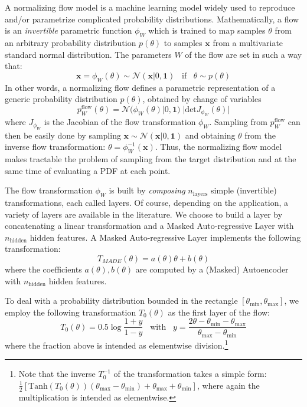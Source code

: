 \documentclass[twocolumn,showpacs,preprintnumbers,nofootinbib,prd,
superscriptaddress,10pt]{revtex4-2}
\begin{document}
A normalizing flow model \cite{norm_flow, nflows_paper, Kobyzev_2021, Papamakarios_thesis} is a machine learning model widely used to reproduce and/or parametrize complicated probability distributions.
Mathematically, a flow is an {\it invertible} parametric function $\phi_W$ which is trained to map samples $\theta$ from an arbitrary probability distribution $p(\theta)$ to samples $\mathbf{x}$ from a multivariate standard normal distribution.
The parameters $W$ of the flow are set in such a way that:
\begin{equation}
	\mathbf{x} = \phi_W(\theta) \sim \mathcal{N}(\mathbf{x}|0,\mathbf{1}) \;\;\; \text{if} \;\;\;  \theta \sim p(\theta)
\end{equation}
%
In other words, a normalizing flow defines a parametric representation of a generic probability distribution $p(\theta)$, obtained by change of variables
\begin{equation}\label{eq:p_flow}
	p^\text{flow}_W(\theta) = \mathcal{N}(\phi_W(\theta)|0,\mathbf{1}) \; |\text{det} J_{\phi_W}(\theta)|
\end{equation}
where $J_{\phi_W}$ is the Jacobian of the flow transformation $\phi_W$.
Sampling from $p^\text{flow}_W$ can then be easily done by sampling $\mathbf{x} \sim \mathcal{N}(\mathbf{x}|0,\mathbf{1})$ and obtaining $\theta$ from the inverse flow transformation: $\theta = \phi_W^{-1}(\mathbf{x})$.
Thus, the normalizing flow model makes tractable the problem of sampling from the target distribution and at the same time of evaluating a PDF at each point.


The flow transformation $\phi_W$ is built by {\it composing} $n_\text{layers}$ simple (invertible) transformations, each called layers. Of course, depending on the application, a variety of layers are available in the literature. We choose to build a layer by concatenating a linear transformation and a Masked Auto-regressive Layer \cite{MADE, MAF,MAF_bis} with $n_\text{hidden}$ hidden features.
A Masked Auto-regressive Layer implements the following transformation:
\begin{equation}
	T_{MADE}(\theta) = a(\theta)\theta+b(\theta)
\end{equation}
where the coefficients $a(\theta), b(\theta)$ are computed by a (Masked) Autoencoder with $n_\text{hidden}$ hidden features.

To deal with a probability distribution bounded in the rectangle $[\theta_\text{min}, \theta_\text{max}]$, we employ the following transformation $T_0(\theta)$ as the first layer of the flow:
\begin{equation}\label{eq:first_transform}
	T_0(\theta) = 0.5 \log \frac{1 + y}{1 - y} \;\;\; \text{with} \;\;\; y = \frac{2\theta - \theta_\text{min} - \theta_\text{max}}{\theta_\text{max}- \theta_\text{min}}
\end{equation}
where the fraction above is intended as elementwise division.\footnote{
Note that the inverse $T_0^{-1}$ of the transformation takes a simple form: $\frac{1}{2} [\text{Tanh}(T_0(\theta))(\theta_\text{max} - \theta_\text{min})+\theta_\text{max}+ \theta_\text{min}]$, where again the multiplication is intended as elementwise.
}
\end{document}
